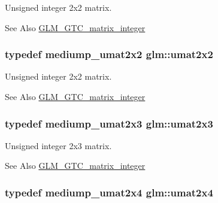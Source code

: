 Unsigned integer 2x2 matrix. 

\begin{DoxySeeAlso}{See Also}
\hyperlink{group__gtc__matrix__integer}{G\-L\-M\-\_\-\-G\-T\-C\-\_\-matrix\-\_\-integer} 
\end{DoxySeeAlso}
\hypertarget{group__gtc__matrix__integer_gad3c997b31dd69bdb4787867e758ed48d}{
\subsubsection[{umat2x2}]{\setlength{\rightskip}{0pt plus 5cm}typedef mediump\-\_\-umat2x2 {\bf glm\-::umat2x2}}}\label{group__gtc__matrix__integer_gad3c997b31dd69bdb4787867e758ed48d}


Unsigned integer 2x2 matrix. 

\begin{DoxySeeAlso}{See Also}
\hyperlink{group__gtc__matrix__integer}{G\-L\-M\-\_\-\-G\-T\-C\-\_\-matrix\-\_\-integer} 
\end{DoxySeeAlso}
\hypertarget{group__gtc__matrix__integer_ga890ae28f9230794138b2c89f44ce3376}{
\subsubsection[{umat2x3}]{\setlength{\rightskip}{0pt plus 5cm}typedef mediump\-\_\-umat2x3 {\bf glm\-::umat2x3}}}\label{group__gtc__matrix__integer_ga890ae28f9230794138b2c89f44ce3376}


Unsigned integer 2x3 matrix. 

\begin{DoxySeeAlso}{See Also}
\hyperlink{group__gtc__matrix__integer}{G\-L\-M\-\_\-\-G\-T\-C\-\_\-matrix\-\_\-integer} 
\end{DoxySeeAlso}
\hypertarget{group__gtc__matrix__integer_ga3b23b164240cf4dfb429776da7be9d88}{
\subsubsection[{umat2x4}]{\setlength{\rightskip}{0pt plus 5cm}typedef mediump\-\_\-umat2x4 {\bf glm\-::umat2x4}}}\label{group__gtc__matrix__integer_ga3b23b164240cf4dfb429776da7be9d88}


